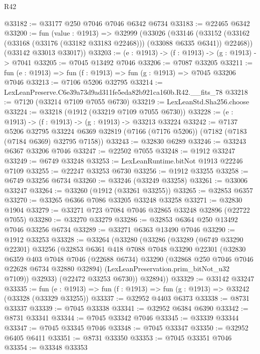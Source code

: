 \begin{lexlean}{R42}
\begin{coremodule}
{@33182 := @33177 @250 @7046 @7046 @6342 @6734
@33183 := @22465 @6342
@33200 := fun (value : @1913) =>
  @32999
    (@33026
      (@33146
        (@33152 (@33162 (@33168 (@33176 (@33182 @33183 @22468))) (@33088 @6335 @6341)) @22468))
      (@33142 @33013 @33017))
@33203 := (e : @1913) -> (f : @1913) -> (g : @1913) -> @7041
@33205 := @7045 @13492 @7046
@33206 := @7087 @33205
@33211 := fun (e : @1913) => fun (f : @1913) => fun (g : @1913) => @7045 @33206 @7046
@33213 := @7106 @5206 @32795
@33214 := LexLeanPreserve.C6e39a73d9ad311fe5eda82b921ca160b.R42.__fits_78
@33218 := @7120 (@33214 @7109 @7055 @6730)
@33219 := LexLeanStd.Sha256.choose
@33224 := @33218 (@1912 (@33219 @7109 @7055 @6730))
@33228 := (e : @1913) -> (f : @1913) -> (g : @1913) -> @33213 @33224
@33242 := @7137
    @5206
    @32795
    @33224
    @6369
    @32819
    (@7166 (@7176 @5206))
    (@7182 (@7183 (@7184 @6369) @32795 @7158))
@33243 := @32830 @6289
@33246 := @33243 @6367 @33206 @7046
@33247 := @22502 @7055
@33248 := @1912 @33247
@33249 := @6749 @33248
@33253 := LexLeanRuntime.bitNot @1913 @22246 @7109
@33255 := @22247 @33253 @6730
@33256 := @1912 @33255
@33258 := @6749 @33256 @6734
@33260 := @33246 (@33249 @33258)
@33261 := @33006 @33247
@33264 := @33260 (@1912 (@33261 @33255))
@33265 := @32853 @6357
@33270 := @33265 @6366 @7086 @33205 @33248 @33258
@33271 := @32830 @1904
@33279 := @33271 @723 @7084 @7046 @32865 @33248 @32896 (@22722 @7055)
@33280 := @33270 @33279
@33286 := @32853 @6364 @250 @13492 @7046 @33256 @6734
@33289 := @33271 @6363 @13490 @7046
@33290 := @1912 @33253
@33328 := @33264
    (@33280
      (@33286
        (@33289
          (@6749 @33290 @22301)
          @33256
          (@32853
            @6361
            @418
            @7088
            @7048
            @33290
            @22301
            (@32830
              @6359
              @403
              @7048
              @7046
              (@22688 @6734)
              @33290
              (@32868 @250 @7046 @7046 @22628 @6734 @32880 @32894)
              (LexLeanPreservation.prim_bitNot_u32 @7109))
            @32933)
          (@22472 @33253 @6730))
        @32894))
@33329 := @33142 @33247
@33335 := fun (e : @1913) => fun (f : @1913) => fun (g : @1913) => @33242 (@33328 (@33329 @33255))
@33337 := @32952 @4403 @6373
@33338 := @8731 @33337
@33339 := @7045 @33338
@33341 := @32952 @6384 @6390
@33342 := @8731 @33341
@33344 := @7045 @33342 @7046
@33345 := @33339 @33344
@33347 := @7045 @33345 @7046
@33348 := @7045 @33347
@33350 := @32952 @6405 @6411
@33351 := @8731 @33350
@33353 := @7045 @33351 @7046
@33354 := @33348 @33353
}
\end{coremodule}
\end{lexlean}
